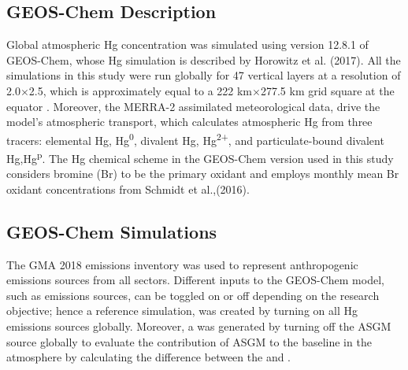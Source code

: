\subsection{GEOS-Chem Description}
\begin{flushleft}


Global atmospheric Hg concentration was simulated using version 12.8.1 of GEOS-Chem, whose Hg simulation is described by Horowitz et al. (2017)\cite{horowitz_new_2017}. All the simulations in this study were run globally for 47 vertical layers at a resolution of 2.0$\times$2.5, which is approximately equal to a 222 km$\times$277.5 km grid square at the equator \cite{horowitz_new_2017}. Moreover, the MERRA-2 assimilated meteorological data,\cite{gelaro_modern-era_2017} drive the model's atmospheric transport, which calculates atmospheric Hg from three tracers: elemental Hg, Hg\textsuperscript{0}, divalent Hg, Hg\textsuperscript{2+}, and particulate-bound divalent Hg,Hg\textsuperscript{p}. The Hg chemical scheme in the GEOS-Chem version used in this study considers bromine (Br) to be the primary \hg oxidant\cite{horowitz_new_2017} and employs monthly mean Br oxidant concentrations from Schmidt et al.,(2016)\cite{schmidt_modeling_2016}. 
\end{flushleft}
\begin{flushleft}
\subsection{GEOS-Chem Simulations}
The GMA 2018 emissions inventory was used to represent anthropogenic emissions sources from all sectors\cite{steenhuisen_development_2019}. Different inputs to the GEOS-Chem model, such as emissions sources, can be toggled on or off depending on the research objective; hence a reference simulation, \on was created by turning on all Hg emissions sources globally. Moreover, a \off was generated by turning off the ASGM source globally to evaluate the contribution of ASGM to the baseline \hg in the atmosphere by calculating the difference between the \on and \off.
\end{flushleft}


